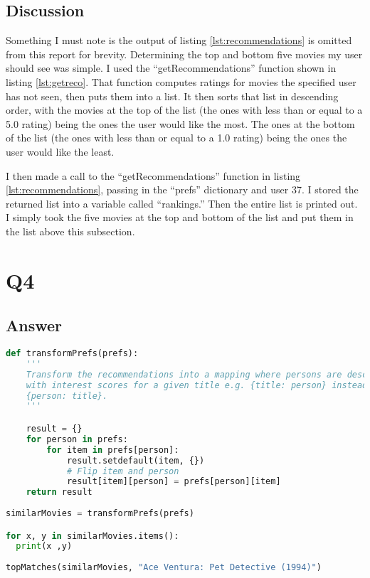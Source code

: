 \documentclass[12pt]{article}
\begin{document}
\subsection*{Discussion}
Something I must note is the output of listing \ref{lst:recommendations} is omitted from this report for brevity.  Determining the top and bottom five movies my user should see was simple.  I used the ``getRecommendations'' function shown in listing \ref{lst:getreco}.  That function computes ratings for movies the specified user has not seen, then puts them into a list.  It then sorts that list in descending order, with the movies at the top of the list (the ones with less than or equal to a 5.0 rating) being the ones the user would like the most.  The ones at the bottom of the list (the ones with less than or equal to a 1.0 rating) being the ones the user would like the least.

I then made a call to the ``getRecommendations'' function in listing \ref{lst:recommendations}, passing in the ``prefs'' dictionary and user 37.  I stored the returned list into a variable called ``rankings.''  Then the entire list is printed out.  I simply took the five movies at the top and bottom of the list and put them in the list above this subsection.

\section*{Q4}

\subsection*{Answer}

\begin{lstlisting}[language=Python, caption=transformPrefs function copy-pasted from the week-11 Colab notebook along with cells of code used to determine similar movies to my favorite and least favorite movies., label=lst:transform]
def transformPrefs(prefs):
    '''
    Transform the recommendations into a mapping where persons are described
    with interest scores for a given title e.g. {title: person} instead of
    {person: title}.
    '''

    result = {}
    for person in prefs:
        for item in prefs[person]:
            result.setdefault(item, {})
            # Flip item and person
            result[item][person] = prefs[person][item]
    return result
    
similarMovies = transformPrefs(prefs)

for x, y in similarMovies.items():
  print(x ,y)
  
topMatches(similarMovies, "Ace Ventura: Pet Detective (1994)")
\end{lstlisting}
\end{document}
